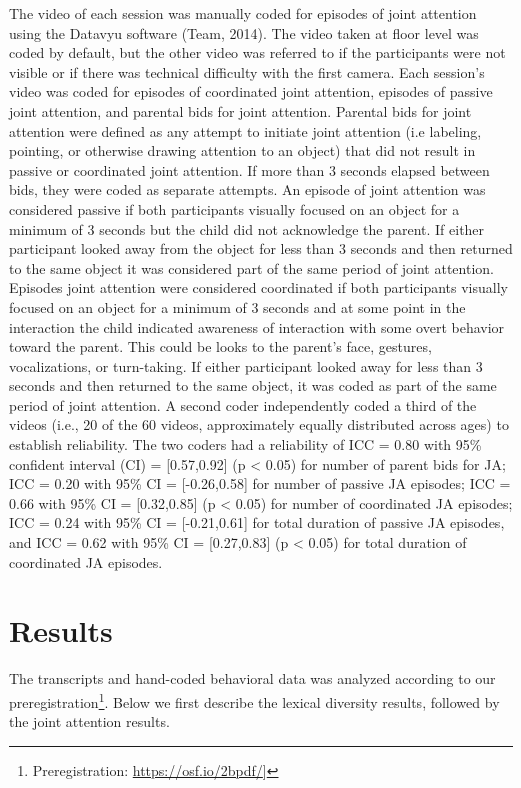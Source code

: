 \documentclass[10pt, letterpaper]{article}
\begin{document}
The video of each session was manually coded for episodes of joint
attention using the Datavyu software (Team, 2014). The video taken at
floor level was coded by default, but the other video was referred to if
the participants were not visible or if there was technical difficulty
with the first camera. Each session's video was coded for episodes of
coordinated joint attention, episodes of passive joint attention, and
parental bids for joint attention. Parental bids for joint attention
were defined as any attempt to initiate joint attention (i.e labeling,
pointing, or otherwise drawing attention to an object) that did not
result in passive or coordinated joint attention. If more than 3 seconds
elapsed between bids, they were coded as separate attempts. An episode
of joint attention was considered passive if both participants visually
focused on an object for a minimum of 3 seconds but the child did not
acknowledge the parent. If either participant looked away from the
object for less than 3 seconds and then returned to the same object it
was considered part of the same period of joint attention. Episodes
joint attention were considered coordinated if both participants
visually focused on an object for a minimum of 3 seconds and at some
point in the interaction the child indicated awareness of interaction
with some overt behavior toward the parent. This could be looks to the
parent's face, gestures, vocalizations, or turn-taking. If either
participant looked away for less than 3 seconds and then returned to the
same object, it was coded as part of the same period of joint attention.
A second coder independently coded a third of the videos (i.e., 20 of
the 60 videos, approximately equally distributed across ages) to
establish reliability. The two coders had a reliability of ICC = 0.80
with 95\% confident interval (CI) = {[}0.57,0.92{]} (p \textless{} 0.05)
for number of parent bids for JA; ICC = 0.20 with 95\% CI =
{[}-0.26,0.58{]} for number of passive JA episodes; ICC = 0.66 with 95\%
CI = {[}0.32,0.85{]} (p \textless{} 0.05) for number of coordinated JA
episodes; ICC = 0.24 with 95\% CI = {[}-0.21,0.61{]} for total duration
of passive JA episodes, and ICC = 0.62 with 95\% CI = {[}0.27,0.83{]} (p
\textless{} 0.05) for total duration of coordinated JA episodes.

\section{Results}\label{results}

The transcripts and hand-coded behavioral data was analyzed according to
our preregistration\footnote{Preregistration:
  \url{https://osf.io/2bpdf/}{]}}. Below we first describe the lexical
diversity results, followed by the joint attention results.
\end{document}
